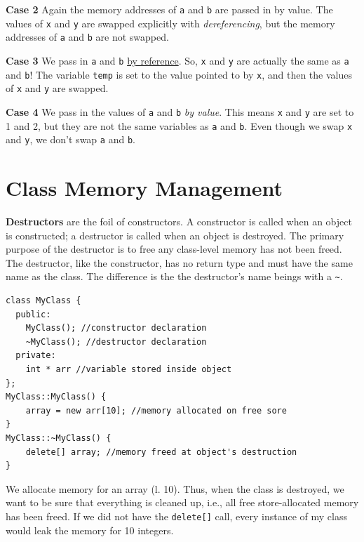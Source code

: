 \documentclass[12pt]{article}
\begin{document}
\textbf{Case 2} Again the memory addresses of \texttt{a} and
\texttt{b} are passed in by value.  The values of \texttt{x} and
\texttt{y} are swapped explicitly with \textit{dereferencing}, but the
memory addresses of \texttt{a} and \texttt{b} are not swapped.

\textbf{Case 3} We pass in \texttt{a} and \texttt{b} \underline{by
  reference}.  So, \texttt{x} and \texttt{y} are actually the same as
\texttt{a} and \texttt{b}! The variable \texttt{temp} is set to the
value pointed to by \texttt{x}, and then the values of \texttt{x} and
\texttt{y} are swapped.

\textbf{Case 4} We pass in the values of \texttt{a} and \texttt{b}
\textit{by value}.  This means \texttt{x} and \texttt{y} are set to 1
and 2, but they are not the same variables as \texttt{a} and
\texttt{b}.  Even though we swap \texttt{x} and \texttt{y}, we don't
swap \texttt{a} and \texttt{b}.

\section{Class Memory Management}

\textbf{Destructors} are the foil of constructors.  A constructor is
called when an object is constructed; a destructor is called when an
object is destroyed.  The primary purpose of the destructor is to free
any class-level memory has not been freed.  The destructor, like the
constructor, has no return type and must have the same name as the
class.  The difference is the the destructor's name beings with a
\texttt{\~}.

\begin{verbatim}
class MyClass {
  public:
    MyClass(); //constructor declaration  
    ~MyClass(); //destructor declaration
  private:
    int * arr //variable stored inside object
};
MyClass::MyClass() {
    array = new arr[10]; //memory allocated on free sore
}
MyClass::~MyClass() {
    delete[] array; //memory freed at object's destruction
}
\end{verbatim}
\label{code:destructor}

We allocate memory for an array (l. 10).  Thus, when the class is
destroyed, we want to be sure that everything is cleaned up, i.e., all
free store-allocated memory has been freed.  If we did not have the
\texttt{delete[]} call, every instance of my class would leak the
memory for 10 integers.
\end{document}
